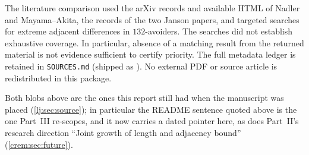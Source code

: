 \documentclass[11pt,a4paper]{article}
\theoremstyle{definition}\newaliascnt{definition}{theorem}
\theoremstyle{remark}\newaliascnt{remark}{theorem}
\begin{document}
The literature comparison used the arXiv records and available HTML of
Nadler and Mayama--Akita, the records of the two Janson papers, and
targeted searches for extreme adjacent differences in $132$-avoiders.
The searches did not establish exhaustive coverage. In particular,
absence of a matching result from the returned material is not evidence
sufficient to certify priority. The full metadata ledger is retained in
\texttt{SOURCES.md} (shipped as ). No
external PDF or source article is redistributed in this package.

Both blobs above are the ones this report still had when the manuscript was
placed (\cref{lj:sec:source}); in particular the README sentence quoted
above is the one Part~III re-scopes, and it now carries a dated pointer
here, as does Part~II's research direction ``Joint growth of length and
adjacency bound'' (\cref{crem:sec:future}).
\end{document}
